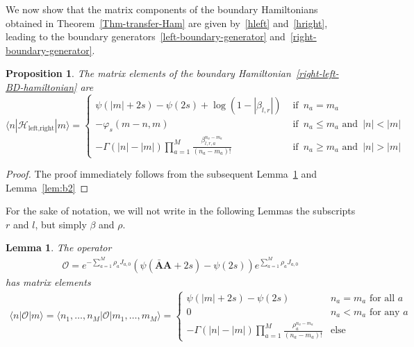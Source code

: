\documentclass[11pt]{article}
\numberwithin{equation}{section}
\newtheorem{proposition}[theorem]{Proposition}
\newtheorem{lemma}[theorem]{Lemma}
\newcommand{\OA}{\mathbf{A}}
\newcommand{\OAD}{\mathbf{\bar{A}}}
\newcommand{\M}{M}
\begin{document}
We now show that the matrix components of the boundary Hamiltonians obtained in Theorem~\eqref{Thm-transfer-Ham} are given by~\eqref{hleft} and~\eqref{hright}, leading to the boundary generators~\eqref{left-boundary-generator} and~\eqref{right-boundary-generator}. 
\begin{proposition}\label{proposition-Boundary-elemnents}
 The matrix elements of the boundary Hamiltonian~\eqref{right-left-BD-hamiltonian} are
 \begin{equation}
     \langle n|\mathcal{H}_{\text{left},\text{right}} |m\rangle =\begin{cases}
					\psi(|m|+2s)-\psi(2s)+\log(1-|\beta_{l,r}|)& \text{ if }\,n_a=m_a \\
					-\varphi_s(m-n,m)& \text{ if }\,n_a\leq m_a \text{ and }\, |n|<|m|\\
					-\Gamma (|n|-|m|)\prod_{a=1}^{\M}\frac{\beta_{l,r,a}^{n_{a}-m_a}}{(n_{a}-m_a)!}
					&\text{ if }\, n_{a}\geq m_{a}\text{ and }\,|n|>|m|\;				\end{cases}
	 \end{equation}
\end{proposition}
\begin{proof}
The proof immediately follows from the subsequent Lemma~\ref{lem:b1} and Lemma~\ref{lem:b2}
\end{proof}
For the sake of notation, we will not write in the following Lemmas the subscripts $r$ and $l$, but simply $\beta$ and $\rho$. 
\begin{lemma}\label{lem:b1}
The operator
\begin{equation}\label{O}
\begin{split}
\mathcal{O}=
 e^{-\sum_{a=1}^{\M}\rho_{a}J_{a,0}}\left(\psi(\OAD\OA+2s)-\psi(2s)\right )e^{\sum_{a=1}^{\M}\rho_{a}J_{a,0}}
 \end{split}
\end{equation}
has matrix elements
\begin{equation}\label{eq:compb1}
\begin{split}
\langle n|\mathcal{O}|m\rangle=\langle n_1,\ldots,n_\M|\mathcal{O}|m_1,\ldots,m_\M\rangle=\begin{cases}
                                \psi(|m|+2s)-\psi(2s)& n_a=m_a \text{ for all } a\\
						0& n_a<m_a \text{ for any } a\\
                              -\Gamma (|n|-|m|)\prod_{a=1}^{\M}\frac{\rho_{a}^{n_{a}-m_a}}{(n_{a}-m_a)!}
						& \text{else}
                              \end{cases}
 \end{split}
\end{equation}
\end{lemma}
\end{document}
